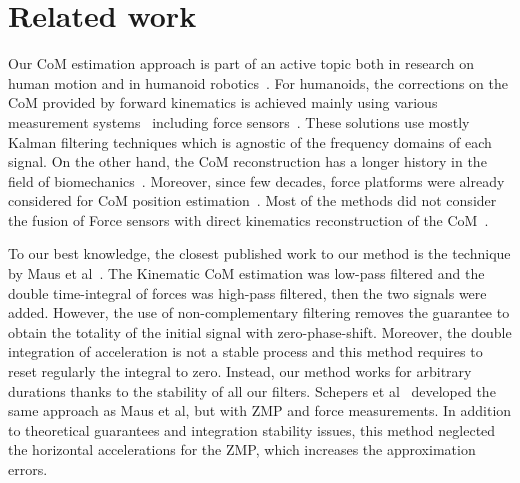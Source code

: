 \section{Related work}
\label{sec:related}
Our CoM estimation approach is part of an active topic both in research on human motion and in humanoid robotics~\cite{Cotton2009itm}. For humanoids, the corrections on the CoM provided by forward kinematics is achieved mainly using various measurement systems~\cite{fallon2014drift} including force sensors~\cite{stephens2011state,Xinjilefu2012iros}. These solutions use mostly Kalman filtering techniques which is agnostic of the frequency domains of each signal. On the other hand, the CoM reconstruction has a longer history in the field of biomechanics~\cite{Eng1993gaitnposture}. Moreover, since few decades, force platforms were already considered for CoM position estimation~\cite{shimba1984estimation}. Most of the methods did not consider the fusion of Force sensors with direct kinematics reconstruction of the CoM~\cite{caron1997jbiomech, barbier2003estimation}. 

To our best knowledge, the closest published work to our method is the technique by Maus et al~\cite{maus2011combining}. The Kinematic CoM estimation was low-pass filtered and the double time-integral of forces was high-pass filtered, then the two signals were added. However, the use of non-complementary filtering removes the guarantee to obtain the totality of the initial signal with zero-phase-shift. Moreover, the double integration of acceleration is not a stable process and this method requires to reset regularly the integral to zero. Instead, our method works for arbitrary durations thanks to the stability of all our filters. Schepers et al~\cite{schepers2009biomen} developed the same approach as Maus et al, but with ZMP and force measurements. In addition to theoretical guarantees and integration stability issues, this method neglected the horizontal accelerations for the ZMP, which increases the approximation errors.
